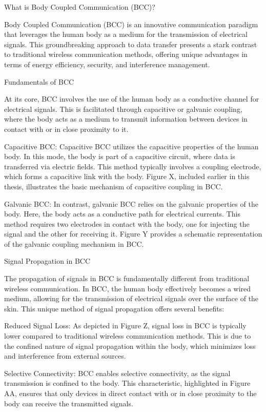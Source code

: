 
What is Body Coupled Communication (BCC)?

Body Coupled Communication (BCC) is an innovative communication paradigm that leverages the human body as a medium for the transmission of electrical signals. This groundbreaking approach to data transfer presents a stark contrast to traditional wireless communication methods, offering unique advantages in terms of energy efficiency, security, and interference management.

Fundamentals of BCC

At its core, BCC involves the use of the human body as a conductive channel for electrical signals. This is facilitated through capacitive or galvanic coupling, where the body acts as a medium to transmit information between devices in contact with or in close proximity to it.

Capacitive BCC: Capacitive BCC utilizes the capacitive properties of the human body. In this mode, the body is part of a capacitive circuit, where data is transferred via electric fields. This method typically involves a coupling electrode, which forms a capacitive link with the body. Figure X, included earlier in this thesis, illustrates the basic mechanism of capacitive coupling in BCC.

Galvanic BCC: In contrast, galvanic BCC relies on the galvanic properties of the body. Here, the body acts as a conductive path for electrical currents. This method requires two electrodes in contact with the body, one for injecting the signal and the other for receiving it. Figure Y provides a schematic representation of the galvanic coupling mechanism in BCC.

Signal Propagation in BCC

The propagation of signals in BCC is fundamentally different from traditional wireless communication. In BCC, the human body effectively becomes a wired medium, allowing for the transmission of electrical signals over the surface of the skin. This unique method of signal propagation offers several benefits:

Reduced Signal Loss: As depicted in Figure Z, signal loss in BCC is typically lower compared to traditional wireless communication methods. This is due to the confined nature of signal propagation within the body, which minimizes loss and interference from external sources.

Selective Connectivity: BCC enables selective connectivity, as the signal transmission is confined to the body. This characteristic, highlighted in Figure AA, ensures that only devices in direct contact with or in close proximity to the body can receive the transmitted signals.

